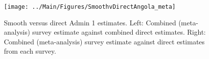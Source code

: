 \documentclass[12pt]{article}\usepackage[]{graphicx}\usepackage[]{color}
\newenvironment{knitrout}{}{} %
\begin{document}

\begin{knitrout}
\color{fgcolor}\begin{figure}[bht]

{\centering \texttt{[image: ../Main/Figures/SmoothvDirectAngola\_meta]} 

}

\caption[Smooth versus direct Admin 1 estimates]{Smooth versus direct Admin 1 estimates. Left: Combined (meta-analysis) survey estimate against combined direct estimates. Right: Combined (meta-analysis) survey estimate against direct estimates from each survey.}\label{fig:unnamed-chunk-3}
\end{figure}


\end{knitrout}
\end{document}

